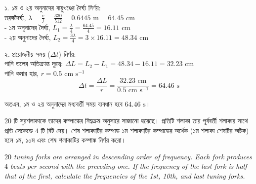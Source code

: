 \documentclass[12pt, a4paper]{article}
\begin{document}
\vspace{1em}

\begin{tcolorbox}[solutionbox={সমাধান (Solution)}]
\noindent
১. ১ম ও ২য় অনুনাদের বায়ুখণ্ডের দৈর্ঘ্য নির্ণয়: \\
তরঙ্গদৈর্ঘ্য, $\lambda = \frac{v}{f} = \frac{330}{512} = 0.6445\text{ m} = 64.45\text{ cm}$ \\
- ১ম অনুনাদের দৈর্ঘ্য, $L_1 = \frac{\lambda}{4} = \frac{64.45}{4} = 16.11\text{ cm}$ \\
- ২য় অনুনাদের দৈর্ঘ্য, $L_2 = \frac{3\lambda}{4} = 3 \times 16.11 = 48.34\text{ cm}$

\noindent
২. প্রয়োজনীয় সময় ($\Delta t$) নির্ণয়: \\
পানি তলের অতিক্রান্ত দূরত্ব: $\Delta L = L_2 - L_1 = 48.34 - 16.11 = 32.23\text{ cm}$ \\
পানি কমার হার, $r = 0.5\text{ cm s}^{-1}$
\[ \Delta t = \frac{\Delta L}{r} = \frac{32.23\text{ cm}}{0.5\text{ cm s}^{-1}} = 64.46\text{ s} \]

\vspace{0.5em}
\noindent
অতএব, ১ম ও ২য় অনুনাদের মধ্যবর্তী সময় ব্যবধান হবে $64.46\text{ s}$।
\end{tcolorbox}

\vspace{1.5em}

\begin{tcolorbox}[questionbox={প্রশ্ন (Question) 3}]
\noindent
$20$ টি সুরশলাকাকে তাদের কম্পাঙ্কের নিম্নক্রম অনুসারে সাজানো হয়েছে। প্রতিটি শলাকা তার পূর্ববর্তী শলাকার সাথে প্রতি সেকেন্ডে $4$ টি বিট দেয়। শেষ শলাকাটির কম্পাঙ্ক ১ম শলাকাটির কম্পাঙ্কের অর্ধেক (১ম শলাকা শেষটির অষ্টক) হলে ১ম, ১০ম এবং শেষ শলাকাটির কম্পাঙ্ক নির্ণয় করো।

\vspace{0.8em}
\begin{english}
\noindent\textit{\color{darkgray}
$20$ tuning forks are arranged in descending order of frequency. Each fork produces $4$ beats per second with the preceding one. If the frequency of the last fork is half that of the first, calculate the frequencies of the 1st, 10th, and last tuning forks.
}
\end{english}
\end{tcolorbox}
\end{document}
